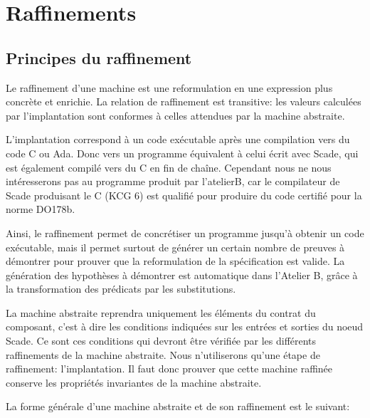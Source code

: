 
\section{Raffinements}

\subsection{Principes du raffinement}

Le raffinement d'une machine est une reformulation en une
expression plus concrète et enrichie. La relation de raffinement est transitive:
les valeurs calculées par l'implantation sont conformes à celles attendues par
la machine abstraite. 

L'implantation correspond à un code exécutable après une compilation vers du
code C ou Ada. Donc vers un programme équivalent à celui écrit avec
Scade, qui est également compilé vers du C en fin de chaîne. Cependant
nous ne nous intéresserons pas au programme produit par l'atelierB,
car le compilateur de Scade produisant le C (KCG 6) est qualifié pour produire
du code certifié pour la norme DO178b.

Ainsi, le raffinement permet de concrétiser un programme jusqu'à obtenir un code
exécutable, mais il permet surtout de générer un certain nombre de preuves à
démontrer pour prouver que la reformulation de la spécification est valide.
La génération des hypothèses à démontrer est automatique dans l'Atelier B, grâce à la
transformation des prédicats par les substitutions. 

La machine abstraite reprendra uniquement les éléments du contrat du composant,
c'est à dire les conditions indiquées sur les entrées et sorties du noeud
Scade. Ce sont ces conditions qui devront être vérifiée par les différents
raffinements de la machine abstraite. Nous n'utiliserons qu'une étape de
raffinement: l'implantation. Il faut donc prouver que cette machine raffinée
conserve les propriétés invariantes de la machine abstraite.

La forme générale d'une machine abstraite et de son raffinement est le suivant:



